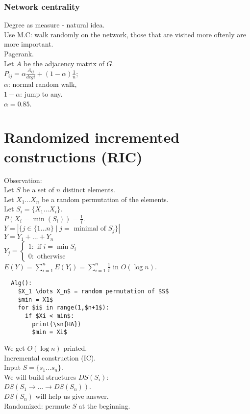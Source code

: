 \documentclass[a4paper, 12pt]{book}
\theoremstyle{definition}
\theoremstyle{remark}
\begin{document}
\subsection*{Network centrality}

Degree as measure - natural idea. \\
Use M.C: walk randomly on the network, those that are visited more oftenly are more important. \\
Pagerank. \\
Let $A$ be the adjacency matrix of $G$. \\
$P_{ij} = \alpha \frac{A_{ij}}{deg i} + (1-\alpha) \frac{1}{n}$; \\
$\alpha$: normal random walk, \\
$1-\alpha$: jump to any. \\
$\alpha = 0.85$.



\chapter{Randomized incremented constructions (RIC)}


Observation: \\
Let $S$ be a set of $n$ distinct elements. \\
Let $X_1 \dots X_n$ be a random permutation of the elements. \\
Let $S_i = \{X_1 \dots X_i\}$. \\
$P(X_i = \min (S_i)) = \frac{1}{i}$. \\
$Y = \left| \{j \in \{1 \dots n\} \mid j = \text{ minimal of } S_j\} \right|$ \\
$Y = Y_1 + \dots + Y_n$ \\
$Y_j = \begin{cases}
  1: \text{ if } i = \min S_i \\
  0: \text{ otherwise}
\end{cases}$ \\
$E(Y) = \sum_{i=1}^{n} E(Y_i) = \sum_{i=1}^{n} \frac{1}{i}$ in $O(\log n)$.
\begin{lstlisting}
  Alg():
    $X_1 \dots X_n$ = random permutation of $S$
    $min = X1$
    for $i$ in range(1,$n+1$):
      if $Xi < min$:
        print(\sn{HA})
        $min = Xi$
\end{lstlisting}
We get $O(\log n)$  printed. \\
Incremental construction (IC). \\
Input $S = \{s_1 \dots s_n\}$. \\
We will build structures $DS(S_i)$: \\
$DS(S_1 \to \dots \to DS(S_n))$. \\
$DS(S_n)$ will help us give answer. \\
Randomized: permute $S$ at the beginning.
\end{document}
